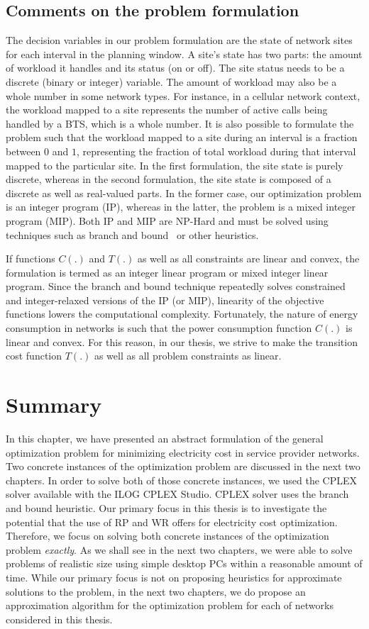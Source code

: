 \subsection{Comments on the problem formulation}
The decision variables in our problem formulation are the state of network sites for each interval in the planning window. A site's state has two parts: the amount of workload it handles and its status (on or off). The site status needs to be a discrete (binary or integer) variable. The amount of workload may also be a whole number in some network types. For instance, in a cellular network context, the workload mapped to a site represents the number of active calls being handled by a BTS, which is a whole number. It is also possible to formulate the problem such that the workload mapped to a site during an interval is a fraction between $0$ and $1$, representing the fraction of total workload during that interval mapped to the particular site. In the first formulation, the site state is purely discrete, whereas in the second formulation, the site state is composed of a discrete as well as real-valued parts. In the former case, our optimization problem is an integer program (IP), whereas in the latter, the problem is a mixed integer program (MIP). Both IP and MIP are NP-Hard and must be solved using techniques such as branch and bound~\cite{land60a} or other heuristics. 

If functions $C(.)$ and $T(.)$ as well as all constraints are linear and convex, the formulation is termed as an integer linear program or mixed integer linear program. Since the branch and bound technique repeatedly solves constrained and integer-relaxed versions of the IP (or MIP), linearity of the objective functions lowers the computational complexity. Fortunately, the nature of energy consumption in networks is such that the power consumption function $C(.)$ is linear and convex. For this reason, in our thesis, we strive to make the transition cost function $T(.)$ as well as all problem constraints as linear.

\section{Summary}
In this chapter, we have presented an abstract formulation of the general optimization problem for minimizing electricity cost in service provider networks. Two concrete instances of the optimization problem are discussed in the next two chapters. In order to solve both of those concrete instances, we used the CPLEX solver available with the ILOG CPLEX Studio. CPLEX solver uses the branch and bound heuristic. Our primary focus in this thesis is to investigate the potential that the use of RP and WR offers for electricity cost optimization. Therefore, we focus on solving both concrete instances of the optimization problem \textit{exactly}. As we shall see in the next two chapters, we were able to solve problems of realistic size using simple desktop PCs within a reasonable amount of time. While our primary focus is not on proposing heuristics for approximate solutions to the problem, in the next two chapters, we do propose an approximation algorithm for the optimization problem for each of networks considered in this thesis. 